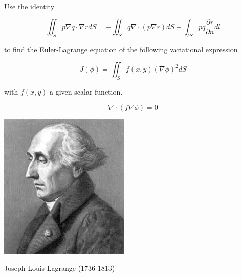 \begin{exer}
Use the identity

$$\iint_S p \nabla q \cdot \nabla r dS= - \iint_S q \nabla \cdot (p \nabla r) dS + \int_{\delta S} pq \frac{\partial r}{\partial n} dl$$

to find the Euler-Lagrange equation of the following variational expression

$$J(\phi)=\iint_S f(x,y) (\nabla \phi)^2 dS$$

with $f(x,y)$ a given scalar function.

\begin{sol}
$$\nabla \cdot \left( f \nabla \phi \right) = 0 $$
\end{sol}
\end{exer}



\begin{marginfigure}[-5.7cm]
  \includegraphics{numeric/figures/j_lagrange}
  \caption{Joseph-Louis Lagrange (1736-1813)}
\end{marginfigure}

\pagebreak

